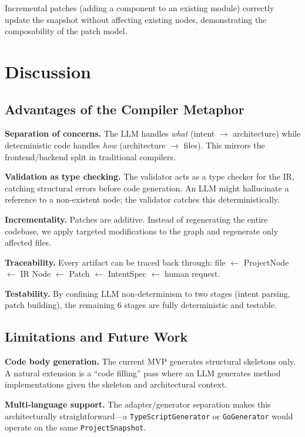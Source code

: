 \documentclass[11pt,a4paper]{article}
\begin{document}
Incremental patches (adding a component to an existing module) correctly update the snapshot without affecting existing nodes, demonstrating the composability of the patch model.

\section{Discussion}

\subsection{Advantages of the Compiler Metaphor}

\textbf{Separation of concerns.} The LLM handles \emph{what} (intent $\rightarrow$ architecture) while deterministic code handles \emph{how} (architecture $\rightarrow$ files). This mirrors the frontend/backend split in traditional compilers.

\textbf{Validation as type checking.} The validator acts as a type checker for the IR, catching structural errors before code generation. An LLM might hallucinate a reference to a non-existent node; the validator catches this deterministically.

\textbf{Incrementality.} Patches are additive. Instead of regenerating the entire codebase, we apply targeted modifications to the graph and regenerate only affected files.

\textbf{Traceability.} Every artifact can be traced back through: file $\leftarrow$ ProjectNode $\leftarrow$ IR Node $\leftarrow$ Patch $\leftarrow$ IntentSpec $\leftarrow$ human request.

\textbf{Testability.} By confining LLM non-determinism to two stages (intent parsing, patch building), the remaining 6 stages are fully deterministic and testable.

\subsection{Limitations and Future Work}

\textbf{Code body generation.} The current MVP generates structural skeletons only. A natural extension is a ``code filling'' pass where an LLM generates method implementations given the skeleton and architectural context.

\textbf{Multi-language support.} The adapter/generator separation makes this architecturally straightforward---a \texttt{TypeScriptGenerator} or \texttt{GoGenerator} would operate on the same \texttt{ProjectSnapshot}.
\end{document}

